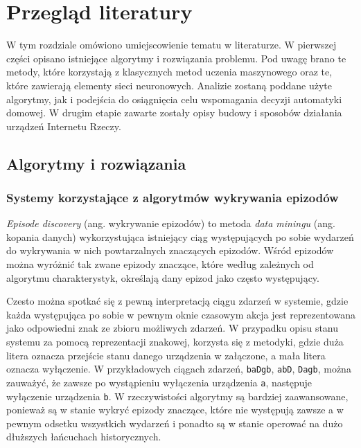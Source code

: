 
\chapter{Przegląd literatury}


W tym rozdziale omówiono umiejscowienie tematu w literaturze. W pierwszej części opisano istniejące algorytmy i rozwiązania problemu. Pod uwagę brano te metody, które korzystają z klasycznych metod uczenia maszynowego oraz te, które zawierają elementy sieci neuronowych. Analizie zostaną poddane użyte algorytmy, jak i podejścia do osiągnięcia celu wspomagania decyzji automatyki domowej. W drugim etapie zawarte zostały opisy budowy i sposobów działania urządzeń Internetu Rzeczy.

\section{Algorytmy i rozwiązania}
\subsection{Systemy korzystające z algorytmów wykrywania epizodów} \label{subsec:episode_discovery}
\textit{Episode discovery} (ang. wykrywanie epizodów) to metoda \textit{data miningu} (ang. kopania danych) wykorzystująca istniejący ciąg występujących po sobie wydarzeń do wykrywania w nich powtarzalnych znaczących epizodów. Wśród epizodów można wyróżnić tak zwane epizody znaczące, które według zależnych od algorytmu charakterystyk, określają dany epizod jako często występujący.

Czesto można spotkać się z pewną interpretacją ciągu zdarzeń w systemie, gdzie każda występująca po sobie w pewnym oknie czasowym akcja jest reprezentowana jako odpowiedni znak ze zbioru możliwych zdarzeń. W przypadku opisu stanu systemu za pomocą reprezentacji znakowej, korzysta się z metodyki, gdzie duża litera oznacza przejście stanu danego urządzenia w załączone, a mała litera oznacza wyłączenie. W przykładowych ciągach zdarzeń, \verb|baDgb|, \verb|abD|, \verb|Dagb|, można zauważyć, że zawsze po wystąpieniu wyłączenia urządzenia \verb|a|, następuje wyłączenie urządzenia \verb|b|. W rzeczywistości algorytmy są bardziej zaawansowane, ponieważ są w stanie wykryć epizody znaczące, które nie występują zawsze a w pewnym odsetku wszystkich wydarzeń i ponadto są w stanie operować na dużo dłuższych łańcuchach historycznych.

